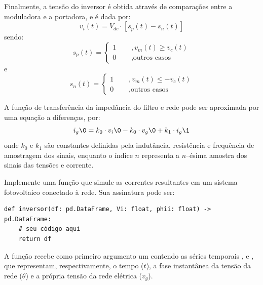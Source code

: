 Finalmente, a tensão do inversor é obtida através de comparações entre a moduladora e a portadora, e é dada por:
\begin{equation}
    \label{eq:vi}
    v_i(t)= V_{dc} \cdot [ s_{p}(t) - s_{n}(t) ]
\end{equation}
sendo:
\begin{equation}
    \label{eq:vp}
    s_{p}(t) =
    \left\{
    \begin{aligned}
        1       & \ \ \ \ \ \ , v_m(t) \geq v_c(t) \\
        0       & \ \ \ \ \ \ , \text{outros casos}
    \end{aligned}
    \right.
\end{equation}
e
\begin{equation}
    \label{eq:vn}
    s_{n}(t) =
    \left\{
    \begin{aligned}
        1       & \ \ \ \ \ \ , v_m(t) \leq -v_c(t) \\
        0       & \ \ \ \ \ \ , \text{outros casos}
    \end{aligned}
    \right.
\end{equation}

A função de transferência da impedância do filtro e rede pode ser aproximada
por uma equação a diferenças, por:
\begin{equation}
{i_g}\0 = k_0 \cdot {v_i}\0 - k_0 \cdot {v_g}\0 + k_1 \cdot {i_g}\1
\end{equation}
onde $k_0$ e $k_1$ são constantes definidas pela indutância, resistência e frequência de amostragem dos sinais,
enquanto o índice $n$ representa a $n$--ésima amostra dos sinais das tensões e corrente.


Implemente uma função que simule as correntes resultantes em um sistema fotovoltaico conectado à rede.
Sua assinatura pode ser:
\begin{verbatim}
def inversor(df: pd.DataFrame, Vi: float, phii: float) -> pd.DataFrame:
    # seu código aqui
    return df
\end{verbatim}

A função recebe como primeiro argumento um  contendo as séries temporais ,  e , que representam,
respectivamente, o tempo ($t$), a fase instantânea da tensão da rede ($\theta$) e a própria tensão da rede
elétrica ($v_g$).

